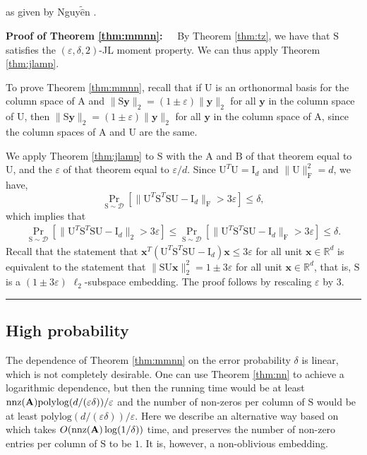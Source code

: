 \documentclass[11pt]{article}
\newcommand{\FNorm }[1]{\mbox{}\|#1\|_\mathrm{F}  }
\newcommand{\FNormS}[1]{\mbox{}\|#1\|_\mathrm{F}^2}
\newcommand{\mat}[1]{{\ensuremath{\bm{\mathrm{#1}}}}}
\newenvironment{proofof}[1]{\begin{trivlist} \item {\bf Proof
#1:~~}}
  {\qed\end{trivlist}}
\def\matA{\mat{A}}
\def\matB{\mat{B}}
\def\matI{\mat{I}}
\def\matS{\mat{S}}
\def\matU{\mat{U}}
\def\nnz{{ \rm nnz }}
\def\qed{\hfill\rule{2mm}{2mm}}
\def\x{{\mathbf x}}
\def\y{{\mathbf y}}
\newcommand{\eps}{\varepsilon}
\newcommand{\polylog}{{\mathrm{polylog}}}
\begin{document}
as given by Nguy$\tilde{\hat{\mbox{e}}}$n \cite{n13}.  
\begin{proofof}{of Theorem \ref{thm:mmnn}}
By Theorem \ref{thm:tz}, we have that $\matS$ satisfies the $(\eps, \delta, 2)$-JL moment property. We can thus apply Theorem \ref{thm:jlamp}. 

To prove Theorem \ref{thm:mmnn}, 
recall that 
if $\matU$ is an orthonormal basis for the column space of $\matA$ and $\|\matS\y\|_2 = (1 \pm \eps)\|\y\|_2$ for all $\y$ in
the column space of $\matU$, then $\|\matS\y\|_2 = (1 \pm \eps)\|\y\|_2$ for all $\y$ in the column space of $\matA$, since the column
spaces of $\matA$ and $\matU$ are the same. 

We apply Theorem \ref{thm:jlamp} to $\matS$ with the $\matA$ and $\matB$ of that theorem equal to $\matU$, 
and the $\eps$ of that theorem equal to $\eps/d$. Since $\matU^T \matU = \matI_d$ and $\FNormS{\matU} = d$, we have,
$$\Pr_{\matS \sim \mathcal{D}} \left [\FNorm{\matU^T \matS^T \matS \matU - \matI_d} > 3 \eps \right ] \leq \delta,$$
which implies that  
\begin{eqnarray*}
\Pr_{\matS \sim \mathcal{D}} \left [\|\matU^T \matS^T \matS\matU -\matI_d\|_2 > 3 \eps \right]
\leq \Pr_{\matS \sim \mathcal{D}} \left [\FNorm{\matU^T \matS^T \matS\matU -\matI_d} > 3 \eps \right]
\leq \delta.
\end{eqnarray*}
Recall that 
the statement that $\x^T(\matU^T \matS^T \matS\matU -\matI_d)\x \leq 3 \eps$ for all unit $\x \in \mathbb{R}^d$ is
equivalent to the statement that $\|\matS\matU\x\|_2^2 = 1 \pm 3\eps$ for all unit $\x \in \mathbb{R}^d$, that is,
$\matS$ is a $(1 \pm 3\eps)$ $\ell_2$-subspace embedding. The proof follows by rescaling $\eps$ by $3$.  
\end{proofof}

\subsection{High probability}\label{sec:whp}
The dependence of Theorem \ref{thm:mmnn} on the error probability $\delta$ is linear, which is not completely
desirable. One can use Theorem \ref{thm:nn} to achieve a logarithmic dependence, but then the running time
would be at least $\nnz(\matA)\polylog(d/(\eps \delta))/\eps$ and the number of non-zeros per column of $\matS$ would
be at least $\polylog(d/(\eps\delta))/\eps$. Here we describe an alternative way based on \cite{BKLW14} 
which takes $O(\nnz(\matA)\log(1/\delta))$
time, and preserves the number of non-zero entries per column of $\matS$ to be $1$. It is, however, a
non-oblivious embedding. 
\end{document}

